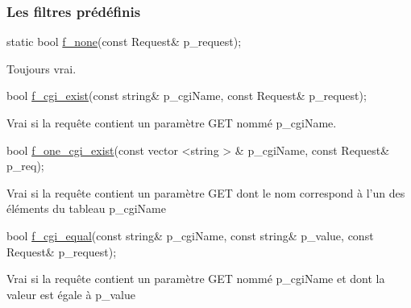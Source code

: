 \subsubsection*{Les filtres prédéfinis }


\begin{DoxyItemize}
\item 
\begin{DoxyCode}
\textcolor{keyword}{static} \textcolor{keywordtype}{bool} \hyperlink{classxtd_1_1network_1_1http_1_1Server_a1007cdff295e30f0009f07c70e8bafcc}{f\_none}(\textcolor{keyword}{const} Request& p\_request); 
\end{DoxyCode}
 Toujours vrai. \par
\par
 \par
\par

\item 
\begin{DoxyCode}
\textcolor{keywordtype}{bool} \hyperlink{classxtd_1_1network_1_1http_1_1Server_a415d74507fdd7b587653c7b348070f09}{f\_cgi\_exist}(\textcolor{keyword}{const} \textcolor{keywordtype}{string}& p\_cgiName, \textcolor{keyword}{const} Request& p\_request); 
\end{DoxyCode}
 Vrai si la requête contient un paramètre G\-E\-T nommé p\-\_\-cgi\-Name. \par
\par
 \par
\par

\item 
\begin{DoxyCode}
\textcolor{keywordtype}{bool} \hyperlink{classxtd_1_1network_1_1http_1_1Server_a0d97dc94a40126765adcbd3330d2e5a2}{f\_one\_cgi\_exist}(\textcolor{keyword}{const} vector <string > & p\_cgiName, \textcolor{keyword}{const} Request& p\_req); 
\end{DoxyCode}
 \par
\par
 Vrai si la requête contient un paramètre G\-E\-T dont le nom correspond à l'un des éléments du tableau p\-\_\-cgi\-Name \par
\par

\item 
\begin{DoxyCode}
\textcolor{keywordtype}{bool} \hyperlink{classxtd_1_1network_1_1http_1_1Server_a66ddce9c1059014c26110cfc06541baf}{f\_cgi\_equal}(\textcolor{keyword}{const} \textcolor{keywordtype}{string}& p\_cgiName, \textcolor{keyword}{const} \textcolor{keywordtype}{string}& p\_value, \textcolor{keyword}{const} Request& p\_request); 
\end{DoxyCode}
 \par
\par
 Vrai si la requête contient un paramètre G\-E\-T nommé p\-\_\-cgi\-Name et dont la valeur est égale à p\-\_\-value \par
\par


\end{DoxyItemize}
